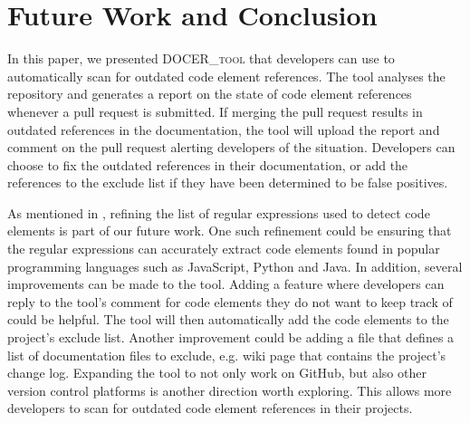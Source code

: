\documentclass[conference]{IEEEtran}
\newcommand{\tool}{\textsc{DOCER\_tool}}
\begin{document}
\section{Future Work and Conclusion}
\label{sec:conclusion}
In this paper, we presented \tool{} that developers can use to automatically scan for outdated code element references. The tool analyses the repository and generates a report on the state of code element references whenever a pull request is submitted. If merging the pull request results in outdated references in the documentation, the tool will upload the report and comment on the pull request alerting developers of the situation. Developers can choose to fix the outdated references in their documentation, or add the references to the exclude list if they have been determined to be false positives.

As mentioned in , refining the list of regular expressions used to detect code elements is part of our future work. One such refinement could be ensuring that the regular expressions can accurately extract code elements found in popular programming languages such as JavaScript, Python and Java. In addition, several improvements can be made to the tool. Adding a feature where developers can reply to the tool's comment for code elements they do not want to keep track of could be helpful. The tool will then automatically add the code elements to the project's exclude list. Another improvement could be adding a file that defines a list of documentation files to exclude, e.g. wiki page that contains the project's change log. Expanding the tool to not only work on GitHub, but also other version control platforms is another direction worth exploring. This allows more developers to scan for outdated code element references in their projects.




\end{document}

